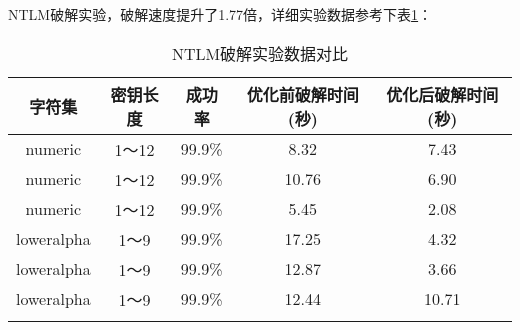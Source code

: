 NTLM破解实验，破解速度提升了1.77倍，详细实验数据参考下表\ref{tab:5.7}：
\begin{longtable}{@{\extracolsep{\fill}}ccccc}
\caption{NTLM破解实验数据对比}\\\toprule[1pt]
\multicolumn{1}{c}{字符集} &
\multicolumn{1}{c}{密钥长度} &
\multicolumn{1}{c}{成功率} &
\multicolumn{1}{c}{优化前破解时间(秒)}&
\multicolumn{1}{c}{优化后破解时间(秒)}\\\midrule
numeric & 1～12 & 99.9\% & 8.32 & 7.43 \\
numeric & 1～12 & 99.9\% & 10.76 & 6.90 \\
numeric & 1～12 & 99.9\% & 5.45 & 2.08 \\\hline
loweralpha & 1～9 & 99.9\% & 17.25 & 4.32 \\
loweralpha & 1～9 & 99.9\% & 12.87 & 3.66 \\
loweralpha & 1～9 & 99.9\% & 12.44 & 10.71 \\
\bottomrule[1pt]
\label{tab:5.7}
\end{longtable}
